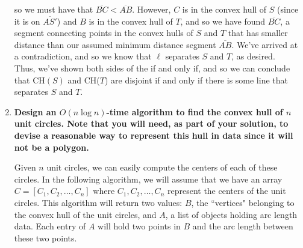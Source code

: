 \documentclass[11pt]{article}
\begin{document}
\begin{enumerate}
    so we must have that $\overline{BC} < \overline{AB}$. However, $C$ is in the convex hull of $S$ (since it is on $\overline{AS'}$) and $B$ is in the convex hull of $T$, and so we have found $\overline{BC}$, a segment connecting points in the convex hulls of $S$ and $T$ that has smaller distance than our assumed minimum distance segment $\overline{AB}$. We've arrived at a contradiction, and so we know that $\ell$ separates $S$ and $T$, as desired. \\
    
    Thus, we've shown both sides of the if and only if, and so we can conclude that CH$(S)$ and CH($T$) are disjoint if and only if there is some line that separates $S$ and $T$.
    \newpage
    
    \item \textbf{Design an $O(n\log n)$-time algorithm to find the convex hull of $n$ unit circles. Note that you will need, as part of your solution, to devise a reasonable way to represent this hull in data since it will not be a polygon.}
    

    Given $n$ unit circles, we can easily compute the centers of each of these circles. In the following algorithm, we will assume that we have an array $C = [C_1, C_2, \dots , C_n]$ where $C_1, C_2, \dots, C_n$ represent the centers of the unit circles. This algorithm will return two values: $B$, the ``vertices" belonging to the convex hull of the unit circles, and $A$, a list of objects holding arc length data. Each entry of $A$ will hold two points in $B$ and the arc length between these two points.


\end{enumerate}
\end{document}
